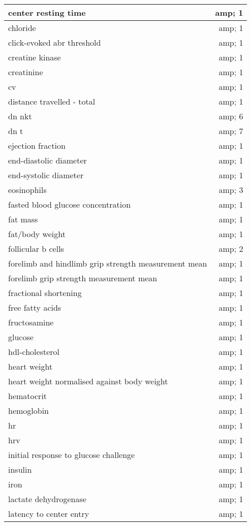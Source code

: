 \documentclass[]{article}
\begin{document}
\begin{tabular}[t]{l|r}
\hline
center resting time &amp; 1\\
\hline
chloride &amp; 1\\
\hline
click-evoked abr threshold &amp; 1\\
\hline
creatine kinase &amp; 1\\
\hline
creatinine &amp; 1\\
\hline
cv &amp; 1\\
\hline
distance travelled - total &amp; 1\\
\hline
dn nkt &amp; 6\\
\hline
dn t &amp; 7\\
\hline
ejection fraction &amp; 1\\
\hline
end-diastolic diameter &amp; 1\\
\hline
end-systolic diameter &amp; 1\\
\hline
eosinophils &amp; 3\\
\hline
fasted blood glucose concentration &amp; 1\\
\hline
fat mass &amp; 1\\
\hline
fat/body weight &amp; 1\\
\hline
follicular b cells &amp; 2\\
\hline
forelimb and hindlimb grip strength measurement mean &amp; 1\\
\hline
forelimb grip strength measurement mean &amp; 1\\
\hline
fractional shortening &amp; 1\\
\hline
free fatty acids &amp; 1\\
\hline
fructosamine &amp; 1\\
\hline
glucose &amp; 1\\
\hline
hdl-cholesterol &amp; 1\\
\hline
heart weight &amp; 1\\
\hline
heart weight normalised against body weight &amp; 1\\
\hline
hematocrit &amp; 1\\
\hline
hemoglobin &amp; 1\\
\hline
hr &amp; 1\\
\hline
hrv &amp; 1\\
\hline
initial response to glucose challenge &amp; 1\\
\hline
insulin &amp; 1\\
\hline
iron &amp; 1\\
\hline
lactate dehydrogenase &amp; 1\\
\hline
latency to center entry &amp; 1\\

\end{tabular}
\end{document}
